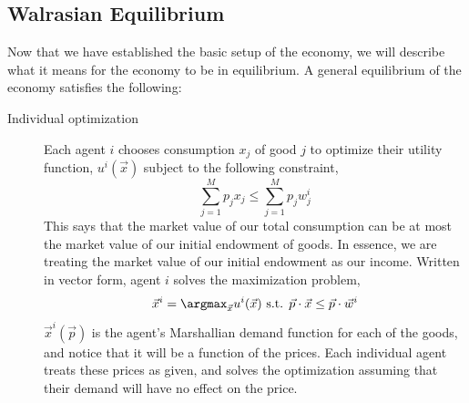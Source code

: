 \subsection*{Walrasian Equilibrium}
Now that we have established the basic setup of the economy, we will describe what it means for the economy to be in equilibrium. A general equilibrium of the economy satisfies the following: 
\begin{description}
    \item[Individual optimization] Each agent $i$ chooses consumption $x_j$ of good $j$ to optimize their utility function, $u^i(\vec{x})$ subject to the following constraint,
    \begin{equation} \label{eq:ge_budget_constraint}
        \sum_{j = 1}^M p_j x_j \leq \sum_{j = 1}^M p_j w^i_j 
    \end{equation} 
    This says that the market value of our total consumption can be at most the market value of our initial endowment of goods. In essence, we are treating the market value of our initial endowment as our income. Written in vector form, agent $i$ solves the maximization problem,
    \begin{align*}
        \vec{x}^i = \argmax_{\vec{x}}u^i(\vec{x}) \text{ s.t. } \vec{p} \cdot \vec{x} \leq \vec{p} \cdot \vec{w}^i
    \end{align*}
    $\vec{x}^i(\vec{p})$ is the agent's Marshallian demand function for each of the goods, and notice that it will be a function of the prices. Each individual agent treats these prices as given, and solves the optimization assuming that their demand will have no effect on the price. 


\end{description}
